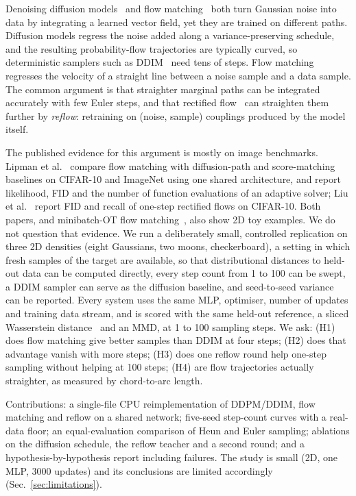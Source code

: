Denoising diffusion models~\cite{ho2020denoising,song2020score} and flow matching~\cite{lipman2022flow,liu2022flow,albergo2022building} both turn Gaussian noise into data by integrating a learned vector field, yet they are trained on different paths. Diffusion models regress the noise added along a variance-preserving schedule, and the resulting probability-flow trajectories are typically curved, so deterministic samplers such as DDIM~\cite{song2020denoising} need tens of steps. Flow matching regresses the velocity of a straight line between a noise sample and a data sample. The common argument is that straighter marginal paths can be integrated accurately with few Euler steps, and that rectified flow~\cite{liu2022flow} can straighten them further by \emph{reflow}: retraining on (noise, sample) couplings produced by the model itself.

The published evidence for this argument is mostly on image benchmarks. Lipman et al.~\cite{lipman2022flow} compare flow matching with diffusion-path and score-matching baselines on CIFAR-10 and ImageNet using one shared architecture, and report likelihood, FID and the number of function evaluations of an adaptive solver; Liu et al.~\cite{liu2022flow} report FID and recall of one-step rectified flows on CIFAR-10. Both papers, and minibatch-OT flow matching~\cite{tong2023improving}, also show 2D toy examples. We do not question that evidence. We run a deliberately small, controlled replication on three 2D densities (eight Gaussians, two moons, checkerboard), a setting in which fresh samples of the target are available, so that distributional distances to held-out data can be computed directly, every step count from 1 to 100 can be swept, a DDIM sampler can serve as the diffusion baseline, and seed-to-seed variance can be reported. Every system uses the same MLP, optimiser, number of updates and training data stream, and is scored with the same held-out reference, a sliced Wasserstein distance~\cite{bonneel2015sliced,kolouri2019generalized} and an MMD, at 1 to 100 sampling steps. We ask: (H1) does flow matching give better samples than DDIM at four steps; (H2) does that advantage vanish with more steps; (H3) does one reflow round help one-step sampling without helping at 100 steps; (H4) are flow trajectories actually straighter, as measured by chord-to-arc length.

Contributions: a single-file CPU reimplementation of DDPM/DDIM, flow matching and reflow on a shared network; five-seed step-count curves with a real-data floor; an equal-evaluation comparison of Heun and Euler sampling; ablations on the diffusion schedule, the reflow teacher and a second round; and a hypothesis-by-hypothesis report including failures. The study is small (2D, one MLP, 3000 updates) and its conclusions are limited accordingly (Sec.~\ref{sec:limitations}).
